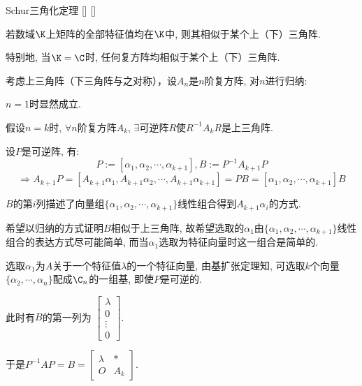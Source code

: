 \documentclass[UTF8]{ctexart}
\begin{document}
		\begin{thm}
			[]
			{Schur三角化定理}
			[]
			[]

			若数域$\K$上矩阵的全部特征值均在$\K$中, 则其相似于某个上（下）三角阵. 

			特别地, 当$\K=\C$时, 任何复方阵均相似于某个上（下）三角阵. 
		\end{thm}

		\begin{prf} 
		
			考虑上三角阵（下三角阵与之对称），设$A_n$是$n$阶复方阵, 对$n$进行归纳: 

			$n=1$时显然成立. 

			假设$n=k$时, $\forall n$阶复方阵$A_k$, $\exists$可逆阵$R$使$R^{-1}A_k R$是上三角阵. 
			
			设$P$是可逆阵, 有: 
			\[P:=[\alpha_1,\alpha_2,\cdots,\alpha_{k+1}], B:=P^{-1}A_{k+1}P\]
			\[\Longrightarrow A_{k+1}P=[A_{k+1}\alpha_1,A_{k+1}\alpha_2,\cdots,A_{k+1}\alpha_{k+1}]=PB=[\alpha_1,\alpha_2,\cdots,\alpha_{k+1}]B\]
			
			$B$的第$i$列描述了向量组$\{\alpha_1,\alpha_2,\cdots,\alpha_{k+1}\}$线性组合得到$A_{k+1}\alpha_i$的方式. 

			希望以归纳的方式证明$B$相似于上三角阵, 故希望选取的$\alpha_1$由$\{\alpha_1,\alpha_2,\cdots,\alpha_{k+1}\}$线性组合的表达方式尽可能简单, 而当$\alpha_1$选取为特征向量时这一组合是简单的. 

			选取$\alpha_1$为$A$关于一个特征值$\lambda$的一个特征向量, 由基扩张定理知, 可选取$k$个向量$\{\alpha_2,\cdots,\alpha_n\}$配成$\C_n$的一组基, 即使$P$是可逆的. 
			
			此时有$B$的第一列为
			$\begin{bmatrix}
				\lambda\\
				0\\
				\vdots\\
				0
			\end{bmatrix}$. 
			
			于是$P^{-1}AP=B=
			\begin{bmatrix}
				\lambda & *\\
				O & A_{k}
			\end{bmatrix}$. 


\end{prf}
\end{document}

